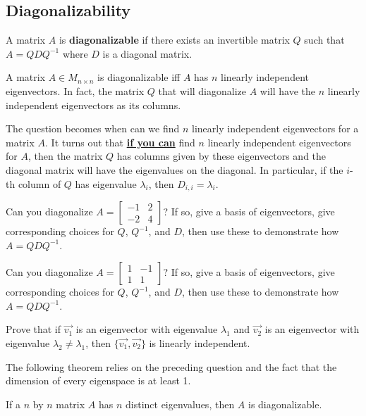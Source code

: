 \subsection{Diagonalizability}
\begin{definition}
A matrix $A$ is \textbf{diagonalizable} if there exists an invertible matrix $Q$ such that $A=QDQ^{-1}$ where $D$ is a diagonal matrix.
\end{definition}
\begin{theorem}
A matrix $A \in M_{n \times n}$ is diagonalizable iff $A$ has $n$ linearly independent eigenvectors. In fact, the matrix $Q$ that will diagonalize $A$ will have the $n$ linearly independent eigenvectors as its columns.
\end{theorem}
The question becomes when can we find $n$ linearly independent eigenvectors for a matrix $A$. It turns out that \textbf{\underline{if you can}} find $n$ linearly independent eigenvectors for $A$, then the matrix $Q$ has columns given by these eigenvectors and the diagonal matrix will have the eigenvalues on the diagonal. In particular, if the $i$-th column of $Q$ has eigenvalue $\lambda_i$, then $D_{i,i} = \lambda_i$.

\bq Can you diagonalize $A=\begin{bmatrix} -1&2\\-2&4 \end{bmatrix}$? If so, give a basis of eigenvectors, give corresponding choices for $Q$, $Q^{-1}$, and $D$, then use these to demonstrate how $A=QDQ^{-1}$. \eq

\bq\label{q14} Can you diagonalize $A=\begin{bmatrix} 1&-1\\1&1 \end{bmatrix}$? If so, give a basis of eigenvectors, give corresponding choices for $Q$, $Q^{-1}$, and $D$, then use these to demonstrate how $A=QDQ^{-1}$. \eq

\bq Prove that if $\vec{v_1}$ is an eigenvector with eigenvalue $\lambda_1$ and $\vec{v_2}$ is an eigenvector with eigenvalue $\lambda_2 \neq \lambda_1$, then $\{ \vec{v_1},\vec{v_2} \}$ is linearly independent.  \eq

The following theorem relies on the preceding question and the fact that the dimension of every eigenspace is at least 1.
\begin{theorem}
If a $n$ by $n$ matrix $A$ has $n$ distinct eigenvalues, then $A$ is diagonalizable.
\end{theorem}

